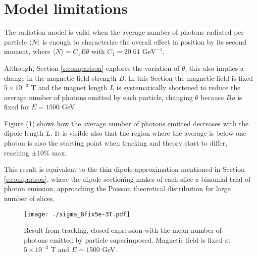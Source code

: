 \section{Model limitations}\label{s:modellim}
The radiation model is valid when the average number of photons radiated per particle $\langle N\rangle$ is enough to characterize the overall effect in position by its second moment, where $\langle N\rangle  = C_1E\theta$ with $C_1=20.61\text{ GeV}^{-1}$.\par
Although, Section \ref{s:comparison} explores the variation of $\theta$, this also implies a change in the magnetic field strength $B$. In this Section the magnetic field is fixed $5 \times 10^{-3}$ T and the magnet length $L$ is systematically shortened to reduce the average number of photons emitted by each particle, changing $\theta$ because $B\rho$ is fixed for $E=1500$ GeV.\par
Figure (\ref{figPhotons}) shows how the average number of photons emitted decreases with the dipole length $L$. It is visible also that the region where the average is below one photon is also the starting point when tracking and theory start to differ, reaching $\pm10\%$ max.\par
This result is equivalent to the thin dipole approximation mentioned in Section \ref{s:comparison}, where the dipole sectioning makes of each slice a binomial trial of photon emission, approaching the Poisson theoretical distribution for large number of slices.\par
\begin{figure}[htb]
\centering
\texttt{[image: ./sigma\_Bfix5e-3T.pdf]} \caption{Result from tracking, closed expression with the mean number of photons emitted by particle superimposed. Magnetic field is fixed at $5\times 10^{-3}$ T and $E=1500$  GeV.}\label{figPhotons}
\end{figure}

